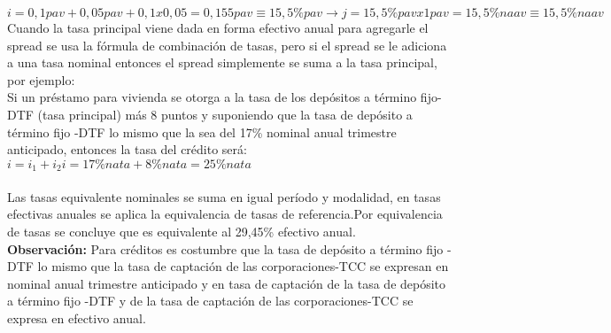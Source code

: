 $i= 0,1 pav + 0,05 pav + 0,1 x 0,05 = 0,155 pav \equiv 15,5\% pav  \rightarrow  j = 15,5\% pav x1 pav = 15,5\%naav \equiv 15,5 \%naav$ \\

Cuando la tasa principal viene dada en forma efectivo anual para agregarle el spread se usa la fórmula de combinación de tasas, pero si el spread se le adiciona a una tasa nominal entonces el spread simplemente se suma a la tasa principal, por ejemplo: \\

Si un préstamo para vivienda se otorga a la tasa de los depósitos a término fijo-DTF (tasa principal) más 8 puntos y suponiendo que la tasa de depósito a término fijo -DTF lo mismo que la sea del 17\% nominal anual trimestre anticipado, entonces la tasa del crédito será: \\

$i = i_{1} + i_{2}
 i = 17\%nata + 8\%nata = 25\% nata$\\\\ Las tasas equivalente nominales se suma en igual período y modalidad, en tasas efectivas anuales se aplica la equivalencia de tasas de referencia.Por equivalencia de tasas se concluye que es equivalente al 29,45\% efectivo anual.\\

\textbf{Observación:} Para créditos es costumbre que la tasa de depósito a término fijo -DTF lo mismo que la tasa de captación de las corporaciones-TCC se expresan en nominal anual trimestre anticipado y en tasa de captación de la tasa de depósito a término fijo -DTF y de la tasa de captación de las corporaciones-TCC se expresa en efectivo anual.\\





%

